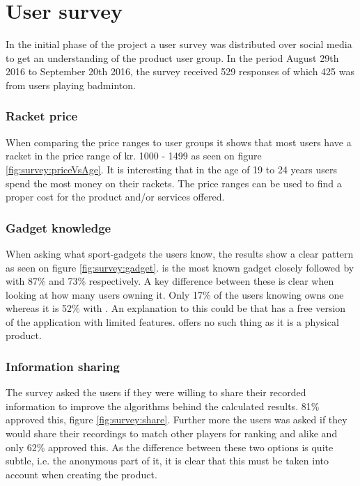 \chapter{User survey}
\label{ch:userSurvey}
In the initial phase of the project a user survey was distributed over social media to get an understanding of the product user group.
In the period August 29th 2016 to September 20th 2016, the survey received 529 responses of which 425 was from users playing badminton.

\subsection*{Racket price}
When comparing the price ranges to user groups it shows that most users have a racket in the price range of kr. 1000 - 1499 as seen on figure \ref{fig:survey:priceVsAge}.
It is interesting that in the age of 19 to 24 years users spend the most money on their rackets.
The price ranges can be used to find a proper cost for the product and/or services offered.


\subsection*{Gadget knowledge}
When asking what sport-gadgets the users know, the results show a clear pattern as seen on figure \ref{fig:survey:gadget}.
 is the most known gadget closely followed by  with 87\% and 73\% respectively.
A key difference between these is clear when looking at how many users owning it.
Only 17\% of the users knowing  owns one whereas it is 52\% with .
An explanation to this could be that  has a free version of the application with limited features.
 offers no such thing as it is a physical product.


\subsection*{Information sharing}
The survey asked the users if they were willing to share their recorded information to improve the algorithms behind the calculated results. 
81\% approved this, figure \ref{fig:survey:share}.
Further more the users was asked if they would share their recordings to match other players for ranking and alike and only 62\% approved this.
As the difference between these two options is quite subtle, i.e. the anonymous part of it, it is clear that this must be taken into account when creating the product.
 
